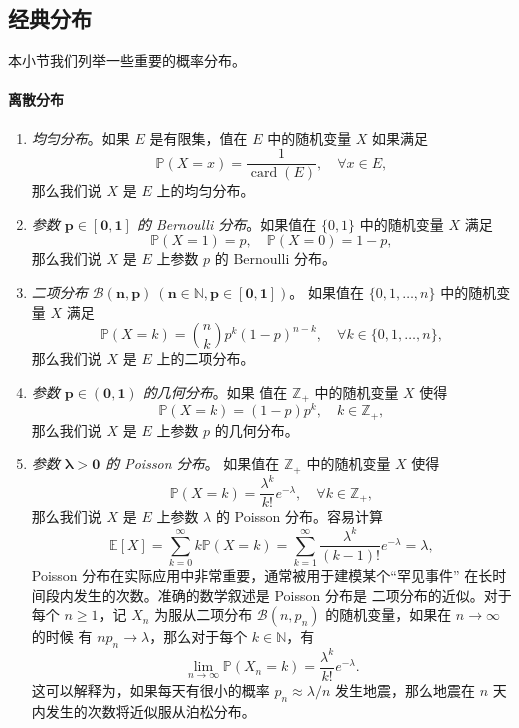 \documentclass[fontset=none]{Notes}
\DeclareMathOperator\card{card}
\begin{document}
\subsection{经典分布}

本小节我们列举一些重要的概率分布。

\paragraph{离散分布}
\begin{enumerate}
  \item \emph{均匀分布}。如果 $E$ 是有限集，值在 $E$ 中的随机变量
  $X$ 如果满足
  \[
    \mathbb{P}(X=x)=\frac{1}{\card(E)},\quad \forall x\in E,  
  \]
  那么我们说 $X$ 是 $E$ 上的均匀分布。
  \item \emph{参数 $\mathbold{p\in[0,1]}$ 的 Bernoulli 分布}。如果值在
  $\{0,1\}$ 中的随机变量 $X$ 满足
  \[
    \mathbb{P}(X=1)=p,\quad \mathbb{P}(X=0)=1-p,  
  \]
  那么我们说 $X$ 是 $E$ 上参数 $p$ 的 Bernoulli 分布。
  \item \emph{二项分布 $\mathbold{\mathcal{B}(n,p)\ (n\in \mathbb{N},p\in[0,1])}$}。
  如果值在 $\{0,1,\dots,n\}$ 中的随机变量 $X$ 满足
  \[
    \mathbb{P}(X=k)=\binom{n}{k}p^k(1-p)^{n-k} ,\quad \forall k\in\{0,1,\dots,n\} ,
  \]
  那么我们说 $X$ 是 $E$ 上的二项分布。
  \item \emph{参数 $\mathbold{p\in(0,1)}$ 的几何分布}。如果
  值在 $\mathbb{Z}_+$ 中的随机变量 $X$ 使得
  \[
    \mathbb{P}(X=k)=(1-p)p^k  ,\quad k\in \mathbb{Z}_+,
  \]
  那么我们说 $X$ 是 $E$ 上参数 $p$ 的几何分布。
  \item \emph{参数 $\mathbold{\lambda>0}$ 的 Poisson 分布}。
  如果值在 $\mathbb{Z}_+$ 中的随机变量 $X$ 使得
  \[
    \mathbb{P}(X=k)=\frac{\lambda^k}{k!}e^{-\lambda},\quad\forall k\in \mathbb{Z}_+,  
  \]
  那么我们说 $X$ 是 $E$ 上参数 $\lambda$ 的 Poisson 分布。容易计算
  \[
    \mathbb{E}[X]=\sum_{k=0}^\infty k \mathbb{P}(X=k)=
    \sum_{k=1}  ^\infty \frac{\lambda^k}{(k-1)!}e^{-\lambda}=\lambda,
  \]
  Poisson 分布在实际应用中非常重要，通常被用于建模某个“罕见事件”
  在长时间段内发生的次数。准确的数学叙述是 Poisson 分布是
  二项分布的近似。对于每个 $n\geq 1$，记 $X_n$ 为服从二项分布
  $\mathcal{B}(n,p_n)$ 的随机变量，如果在 $n\to\infty$ 的时候
  有 $np_n\to\lambda$，那么对于每个 $k\in \mathbb{N}$，有
  \[
    \lim_{n\to\infty} \mathbb{P}(X_n=k)=
    \frac{\lambda^k}{k!}e^{-\lambda}.
  \]
  这可以解释为，如果每天有很小的概率 $p_n\approx\lambda/n$
  发生地震，那么地震在 $n$ 天内发生的次数将近似服从泊松分布。
\end{enumerate}
\end{document}
